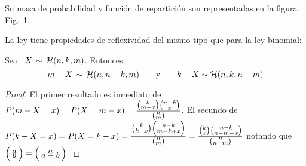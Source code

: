 Su masa  de probabilidad  y funci\'on de  repartici\'on son representadas  en la
figura Fig.~\ref{Fig:MP:Hipergeometrica}.
%
\begin{figure}[h!]
\begin{center}  \end{center}
%
\label{Fig:MP:Hipergeometrica}
\end{figure}


La ley tiene propiedades de reflexividad del mismo tipo que para la ley binomial:
%
\begin{lema}[Reflexividad]
\label{Lem:MP:ReflexividadHipergeometrica}
%
  Sea \ $X \, \sim \, \mathcal{H}(n,k,m)$. Entonces
  \[
  m-X \, \sim \, \mathcal{H}(n,n-k,m) \qquad \mbox{y} \qquad k-X \sim \mathcal{H}(n,k,n-m)
  \]
\end{lema}
%
\begin{proof}
  El  primer   resultado  es  inmediato  de  $P(m-X   =  x)  =  P(X   =  m-x)  =
  \frac{\smallbino{k}{m-x} \smallbino{n-k}{x}}{\smallbino{n}{m}}$. El secundo de
  $P(k-X    =     x)    =     P(X    =    k-x)     =    \frac{\smallbino{k}{k-x}
    \smallbino{n-k}{m-k+x}}{\smallbino{n}{m}}      =      \frac{\smallbino{k}{x}
    \smallbino{n-k}{n-m-x}}{\smallbino{n}{n-m}}$  notando   que  $\bino{a}{b}  =
  \bino{a}{a-b}$.
\end{proof}



